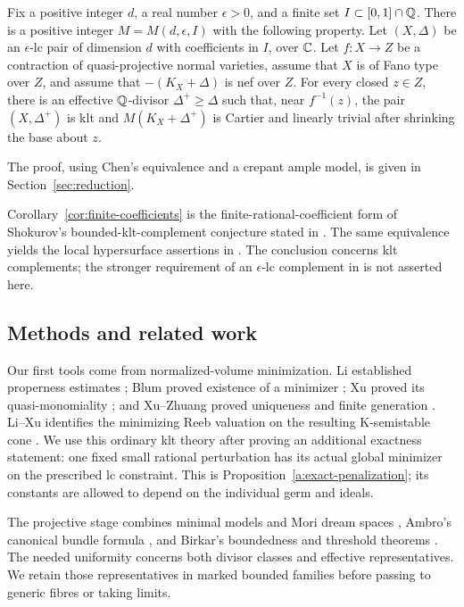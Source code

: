 \begin{corollary}\label{cor:finite-coefficients}
Fix a positive integer $d$, a real number $\epsilon>0$, and a finite set
$I\subset[0,1]\cap\mathbb Q$. There is a positive integer $M=M(d,\epsilon,I)$
with the following property. Let $(X,\Delta)$ be an $\epsilon$-lc pair of
dimension $d$ with coefficients in $I$, over $\mathbb C$. Let $f\colon X\to Z$
be a contraction of quasi-projective normal varieties, assume that $X$ is
of Fano type over $Z$, and assume that $-(K_X+\Delta)$ is nef over $Z$.
For every closed $z\in Z$, there is an effective $\mathbb Q$-divisor
$\Delta^+\ge\Delta$ such that, near $f^{-1}(z)$, the pair
$(X,\Delta^+)$ is klt and $M(K_X+\Delta^+)$ is Cartier and linearly
trivial after shrinking the base about $z$.
\end{corollary}

The proof, using Chen's equivalence and a crepant ample model, is given
in Section~\ref{sec:reduction}.

Corollary~\ref{cor:finite-coefficients} is the finite-rational-coefficient
form of Shokurov's bounded-klt-complement conjecture stated in
\cite[Conjecture~1.1]{Chen}. The same equivalence yields the local
hypersurface assertions in \cite[Conjectures~1.3 and~1.4]{Chen}.
The conclusion concerns klt complements; the stronger requirement of an
$\epsilon$-lc complement in \cite[Remark~1.2(1)]{Chen} is not asserted here.

\subsection{Methods and related work}

Our first tools come from normalized-volume minimization. Li established
properness estimates \cite{LiProperness}; Blum proved existence of a
minimizer \cite{BlumExistence}; Xu proved its quasi-monomiality
\cite{XuQuasimonomial}; and Xu--Zhuang proved uniqueness and finite
generation \cite{XuZhuangUniqueness,XuZhuangStable}. Li--Xu identifies
the minimizing Reeb valuation on the resulting K-semistable cone
\cite{LiXuStable}. We use this ordinary klt theory after proving an
additional exactness statement: one fixed small rational perturbation
has its actual global minimizer on the prescribed lc constraint.
This is Proposition~\ref{a:exact-penalization}; its constants are allowed
to depend on the individual germ and ideals.

The projective stage combines minimal models and Mori dream spaces
\cite{BCHM,HuKeel}, Ambro's canonical bundle formula
\cite{AmbroBoundary,AmbroModuli}, and Birkar's boundedness and
threshold theorems \cite{BirkarBAB,BirkarPolarised,BirkarFibrations}.
The needed uniformity concerns both divisor classes and effective
representatives. We retain those representatives in marked bounded
families before passing to generic fibres or taking limits.

